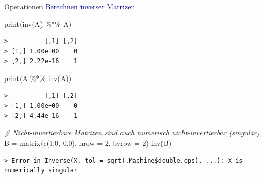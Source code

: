 \documentclass[
  8pt,
  ignorenonframetext,
]{beamer}
\newenvironment{Shaded}{\begin{snugshade}}{\end{snugshade}}
\newcommand{\AttributeTok}[1]{\textcolor[rgb]{0.77,0.63,0.00}{#1}}
\newcommand{\CommentTok}[1]{\textcolor[rgb]{0.56,0.35,0.01}{\textit{#1}}}
\newcommand{\DecValTok}[1]{\textcolor[rgb]{0.00,0.00,0.81}{#1}}
\newcommand{\FunctionTok}[1]{\textcolor[rgb]{0.00,0.00,0.00}{#1}}
\newcommand{\NormalTok}[1]{#1}
\newcommand{\OtherTok}[1]{\textcolor[rgb]{0.56,0.35,0.01}{#1}}
\newcommand{\SpecialCharTok}[1]{\textcolor[rgb]{0.00,0.00,0.00}{#1}}
\begin{document}
\begin{frame}[fragile]{Operationen}
\protect\hypertarget{operationen-27}{}
\textcolor{darkblue}{Berechnen inverser Matrizen} \footnotesize
\vspace{2mm} 

\begin{Shaded}
\begin{Highlighting}[]
\FunctionTok{print}\NormalTok{(}\FunctionTok{inv}\NormalTok{(A) }\SpecialCharTok{\%*\%}\NormalTok{ A)}
\end{Highlighting}
\end{Shaded}

\begin{verbatim}
>          [,1] [,2]
> [1,] 1.00e+00    0
> [2,] 2.22e-16    1
\end{verbatim}

\vspace{2mm}

\begin{Shaded}
\begin{Highlighting}[]
\FunctionTok{print}\NormalTok{(A }\SpecialCharTok{\%*\%} \FunctionTok{inv}\NormalTok{(A))}
\end{Highlighting}
\end{Shaded}

\begin{verbatim}
>          [,1] [,2]
> [1,] 1.00e+00    0
> [2,] 4.44e-16    1
\end{verbatim}

\vspace{2mm}

\begin{Shaded}
\begin{Highlighting}[]
\CommentTok{\# Nicht{-}invertierbare Matrizen sind auch numerisch nicht{-}invertierbar (singulär)}
\NormalTok{B }\OtherTok{=} \FunctionTok{matrix}\NormalTok{(}\FunctionTok{c}\NormalTok{(}\DecValTok{1}\NormalTok{,}\DecValTok{0}\NormalTok{,}
             \DecValTok{0}\NormalTok{,}\DecValTok{0}\NormalTok{),}
           \AttributeTok{nrow  =} \DecValTok{2}\NormalTok{,}
           \AttributeTok{byrow =} \DecValTok{2}\NormalTok{)}
\FunctionTok{inv}\NormalTok{(B)}
\end{Highlighting}
\end{Shaded}

\begin{verbatim}
> Error in Inverse(X, tol = sqrt(.Machine$double.eps), ...): X is numerically singular
\end{verbatim}
\end{frame}
\end{document}
